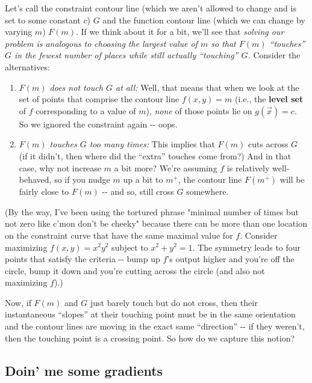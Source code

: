 \documentclass[letterpaper,12pt]{report}
\providecommand{\tightlist}{%
  \setlength{\itemsep}{0pt}\setlength{\parskip}{0pt}}
\begin{document}
Let's call the constraint contour line (which we aren't allowed to
change and is set to some constant \(c\)) \(G\) and the function contour
line (which we can change by varying \(m\)) \(F(m)\). If we think about
it for a bit, we'll see that \emph{solving our problem is analogous to
choosing the largest value of \(m\) so that \(F(m)\) ``touches'' \(G\) in
the fewest number of places while still actually ``touching'' \(G\).}
Consider the alternatives:

\begin{enumerate}
\tightlist
\item
  \emph{\(F(m)\) does not touch \(G\) at all:} Well, that means that
  when we look at the set of points that comprise the contour line
  \(f(x,y) = m\) (i.e., the \textbf{level set} 
   of \(f\) corresponding to
  a value of \(m\)), \emph{none} of those points lie on
  \(g(\vec{x}) = c\). So we ignored the constraint again -\/- oops.
\item
  \emph{\(F(m)\) touches \(G\) too many times:} This implies that
  \(F(m)\) cuts across \(G\) (if it didn't, then where did the ``extra''
  touches come from?) And in that case, why not increase \(m\) a bit
  more? We're assuming \(f\) is relatively well-behaved, so if you nudge
  \(m\) up a bit to \(m^+\), the contour line \(F(m^+)\) will be fairly
  close to \(F(m)\) -\/- and so, still cross \(G\) somewhere.
\end{enumerate}

(By the way, I've been using the tortured phrase "minimal number of
times but not zero like c'mon don't be cheeky" because there can be more
than one location on the constraint curve that have the same maximal
value for \(f\). Consider maximizing \(f(x,y) = x^2 y^2\) subject to
\(x^2 + y^2 = 1\). The symmetry leads to four points that satisfy the
criteria -\/- bump up \(f\)'s output higher and you're off the circle,
bump it down and you're cutting across the circle (and also not
maximizing \(f\)).)

Now, if \(F(m)\) and \(G\) just barely touch but do not cross, then
their instantaneous ``slopes'' at their touching point must be in the same
orientation and the contour lines are moving in the exact same
``direction'' -\/- if they weren't, then the touching point is a crossing
point. So how do we capture this notion?

\subsection{Doin' me some gradients}\label{doin-me-some-gradients}
\end{document}
